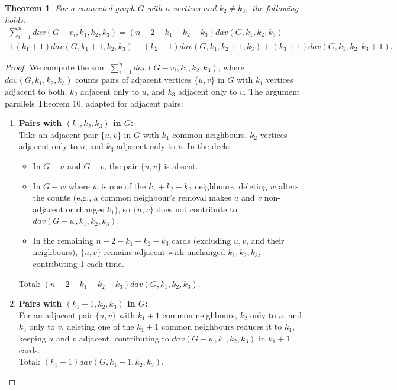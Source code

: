 \documentclass[11pt,oneside]{article}
\newtheorem{thm}{Theorem}
\theoremstyle{definition}
\begin{document}
\begin{thm}\label{t5}
For a connected graph $G$ with $n$ vertices and $k_2 \neq k_3,$ the following holds: 
\begin{multline} 
\sum_{i=1}^{n}{dav(G-v_i,k_1,k_2,k_3)}=(n-2-k_1-k_2-k_3)dav(G,k_1,k_2,k_3)\\+(k_1+1)dav(G,k_1+1,k_2,k_3)
+(k_2+1)dav(G,k_1,k_2+1,k_3)+(k_3+1)dav(G,k_1,k_2,k_3+1). 
\end{multline}
\end{thm}
\begin{proof}

We compute the sum \( \sum_{i=1}^n dav(G - v_i, k_1, k_2, k_3) \), where \( dav(G, k_1, k_2, k_3) \) counts pairs of adjacent vertices \( \{u, v\} \) in \( G \) with \( k_1 \) vertices adjacent to both, \( k_2 \) adjacent only to \( u \), and \( k_3 \) adjacent only to \( v \). The argument parallels Theorem 10, adapted for adjacent pairs:

\begin{enumerate}
\item[\textbf{1.}] \textbf{Pairs with \( (k_1, k_2, k_3) \) in \( G \):}\\
    Take an adjacent pair \( \{u, v\} \) in \( G \) with \( k_1 \) common neighbours, \( k_2 \) vertices adjacent only to \( u \), and \( k_3 \) adjacent only to \( v \). In the deck:
    \begin{itemize}
        \item In \( G - u \) and \( G - v \), the pair \( \{u, v\} \) is absent.
        \item In \( G - w \) where \( w \) is one of the \( k_1 + k_2 + k_3 \) neighbours, deleting \( w \) alters the counts (e.g., a common neighbour's removal makes \( u \) and \( v \) non-adjacent or changes \( k_1 \)), so \( \{u, v\} \) does not contribute to \( dav(G - w, k_1, k_2, k_3) \).
        \item In the remaining \( n - 2 - k_1 - k_2 - k_3 \) cards (excluding \( u, v \), and their neighbours), \( \{u, v\} \) remains adjacent with unchanged \( k_1, k_2, k_3 \), contributing 1 each time.
    \end{itemize}
    Total: \( (n - 2 - k_1 - k_2 - k_3) dav(G, k_1, k_2, k_3) \).

    \item[\textbf{2.}] \textbf{Pairs with \( (k_1 + 1, k_2, k_3) \) in \( G \):} \\
    For an adjacent pair \( \{u, v\} \) with \( k_1 + 1 \) common neighbours, \( k_2 \) only to \( u \), and \( k_3 \) only to \( v \), deleting one of the \( k_1 + 1 \) common neighbours reduces it to \( k_1 \), keeping \( u \) and \( v \) adjacent, contributing to \( dav(G - w, k_1, k_2, k_3) \) in \( k_1 + 1 \) cards. \\
    Total: \( (k_1 + 1) dav(G, k_1 + 1, k_2, k_3) \).


\end{enumerate}
\end{proof}
\end{document}
